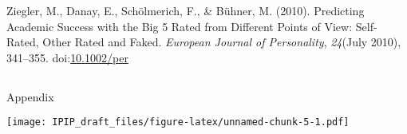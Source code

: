 \documentclass[,man,floatsintext]{apa6}
\theoremstyle{definition}
\theoremstyle{definition}
\theoremstyle{definition}
\theoremstyle{remark}
\begin{document}
\leavevmode\hypertarget{ref-Ziegler2010}{}%
Ziegler, M., Danay, E., Schölmerich, F., \& Bühner, M. (2010).
Predicting Academic Success with the Big 5 Rated from Different Points
of View: Self-Rated, Other Rated and Faked. \emph{European Journal of
Personality}, \emph{24}(July 2010), 341--355.
doi:\href{https://doi.org/10.1002/per}{10.1002/per}

\endgroup

\clearpage
\makeatletter
\efloat@restorefloats
\makeatother


\begin{appendix}
\section{}
Appendix

\texttt{[image: IPIP\_draft\_files/figure-latex/unnamed-chunk-5-1.pdf]}
\end{appendix}
\end{document}
